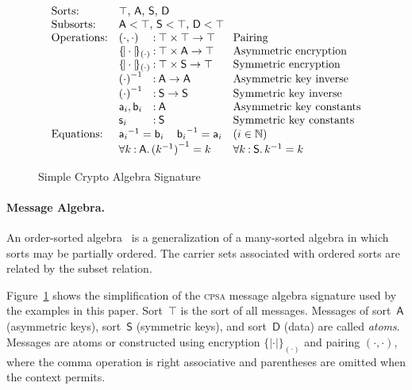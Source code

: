 \documentclass[titlepage,12pt]{article}
\newcommand{\cpsa}{\textsc{cpsa}}
\newcommand{\cn}[1]{\ensuremath{\operatorname{\mathsf{#1}}}}
\newcommand{\srt}[1]{\ensuremath{\mathsf{#1}}}
\newcommand{\typ}{\mathbin:}
\newcommand{\enc}[2]{\ensuremath{\{\!|#1|\!\}_{#2}}}
\newcommand{\invk}[1]{{#1}^{-1}}
\newcommand{\nat}{\ensuremath{\mathbb{N}}}
\newcommand{\all}[1]{\forall#1\mathpunct.}
\begin{document}
\begin{figure}
$$\begin{array}{ll@{{}\typ{}}ll}
\mbox{Sorts:}&
\multicolumn{3}{l}{\mbox{$\top$, $\srt{A}$, $\srt{S}$, $\srt{D}$}}\\
\mbox{Subsorts:}&
\multicolumn{3}{l}{\mbox{$\srt{A}<\top$, $\srt{S}<\top$, $\srt{D}<\top$}}\\
\mbox{Operations:}&(\cdot,\cdot)&\top\times\top\to\top& \mbox{Pairing}\\
&\enc{\cdot}{(\cdot)}&\top\times\srt{A}\to\top&\mbox{Asymmetric encryption}\\
&\enc{\cdot}{(\cdot)}&\top\times\srt{S}\to\top&\mbox{Symmetric encryption}\\
&\invk{(\cdot)}&\srt{A}\to\srt{A}& \mbox{Asymmetric key inverse}\\
&\invk{(\cdot)}&\srt{S}\to\srt{S}& \mbox{Symmetric key inverse}\\
&\cn{a}_i,\cn{b}_i&\srt{A}& \mbox{Asymmetric key constants}\\
&\cn{s}_i&\srt{S}& \mbox{Symmetric key constants}\\
\mbox{Equations:}&\multicolumn{2}{l}{\invk{\cn{a}_i}=\cn{b}_i\quad
\invk{\cn{b}_i}=\cn{a}_i}
&(i\in\nat)\\
&\multicolumn{2}{l}{\all{k\typ\srt{A}}\invk{(\invk{k})}=k}
&\all{k\typ\srt{S}}\invk{k}=k
\end{array}$$
\caption{Simple Crypto Algebra Signature}\label{fig:signature}
\end{figure}

\paragraph{Message Algebra.}

An order-sorted algebra~\cite{GoguenMeseguer92} is a generalization of
a many-sorted algebra in which sorts may be partially ordered.  The
carrier sets associated with ordered sorts are related by the subset
relation.

Figure~\ref{fig:signature} shows the simplification of the {\cpsa}
message algebra signature used by the examples in this paper.
Sort~$\top$ is the sort of all messages.  Messages of sort~$\srt{A}$
(asymmetric keys), sort~$\srt{S}$ (symmetric keys), and sort~$\srt{D}$
(data) are called \emph{atoms}.  Messages are atoms or
constructed using encryption $\enc{\cdot}{(\cdot)}$ and pairing
$(\cdot,\cdot)$, where the comma operation is right associative and
parentheses are omitted when the context permits.
\end{document}
